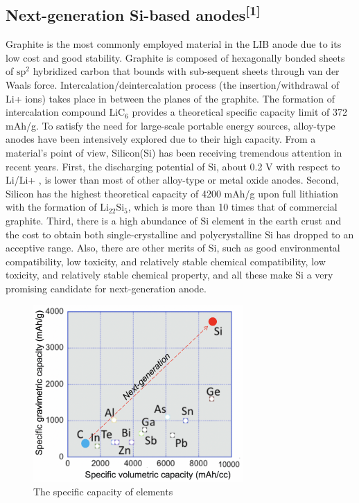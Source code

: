 \subsection{Next-generation Si-based anodes\textsuperscript{[1]}}
Graphite is the most commonly employed material in the LIB anode due to its low cost and good stability. Graphite is composed of hexagonally bonded sheets of $\mathrm{sp^{2}}$ hybridized carbon that bounds with sub-sequent sheets through van der Waals force. Intercalation/deintercalation process (the insertion/withdrawal of Li+ ions) takes place in between the planes of the graphite. The formation of intercalation compound $\mathrm{LiC_{6}}$ provides a theoretical specific capacity limit of 372 mAh/g.
To satisfy the need for large-scale portable energy sources, alloy-type anodes have been intensively explored due to their high capacity. From a material’s point of view, Silicon(Si) has been receiving tremendous attention in recent years. First, the discharging potential of Si, about 0.2 V with respect to Li/Li+ , is lower than most of other alloy-type or metal oxide anodes. Second, Silicon has the highest theoretical capacity of 4200 mAh/g upon full lithiation with the formation of $\mathrm{Li_{22}Si_{5}}$, which is more than 10 times that of commercial graphite. Third, there is a high abundance of Si element in the earth crust and the cost to obtain both single-crystalline and polycrystalline Si has dropped to an acceptive range. Also, there are other merits of Si, such as good environmental compatibility, low toxicity, and relatively stable chemical compatibility, low toxicity, and relatively stable chemical property, and all these make Si a very promising candidate for next-generation anode.
\begin{figure}[h]
\centering
\includegraphics[width=8cm]{src/fig/fig3.png}
\caption{The specific capacity of elements}
\end{figure}
